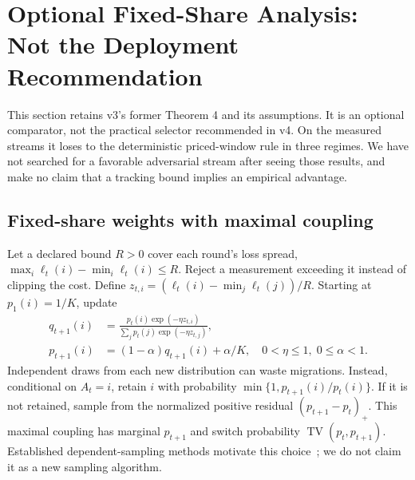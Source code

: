 \section{Optional Fixed-Share Analysis: Not the Deployment Recommendation}\label{app:tracking}
This section retains v3's former Theorem 4 and its assumptions. It is an optional comparator, not the practical selector recommended in v4. On the measured streams it loses to the deterministic priced-window rule in three regimes. We have not searched for a favorable adversarial stream after seeing those results, and make no claim that a tracking bound implies an empirical advantage.
\subsection{Fixed-share weights with maximal coupling}
Let a declared bound $R>0$ cover each round's loss spread, $\max_i\ell_t(i)-\min_i\ell_t(i)\le R$. Reject a measurement exceeding it instead of clipping the cost. Define $z_{t,i}=(\ell_t(i)-\min_j\ell_t(j))/R$. Starting at $p_1(i)=1/K$, update
\begin{align}
 q_{t+1}(i)&=\frac{p_t(i)\exp(-\eta z_{t,i})}{\sum_jp_t(j)\exp(-\eta z_{t,j})},\\
 p_{t+1}(i)&=(1-\alpha)q_{t+1}(i)+\alpha/K,\quad 0<\eta\le1,\;0\le\alpha<1.\label{eq:share}
\end{align}
Independent draws from each new distribution can waste migrations. Instead, conditional on $A_t=i$, retain $i$ with probability $\min\{1,p_{t+1}(i)/p_t(i)\}$. If it is not retained, sample from the normalized positive residual $(p_{t+1}-p_t)_+$. This maximal coupling has marginal $p_{t+1}$ and switch probability $\operatorname{TV}(p_t,p_{t+1})$. Established dependent-sampling methods motivate this choice~\cite{geulen}; we do not claim it as a new sampling algorithm.


